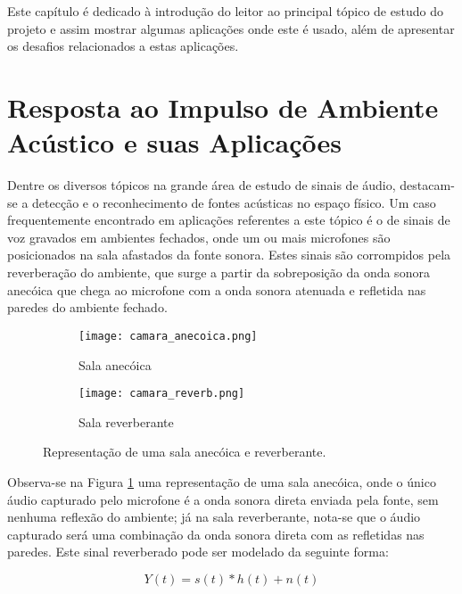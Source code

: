 Este capítulo é dedicado à introdução do leitor ao principal tópico de estudo do projeto e assim mostrar
algumas aplicações onde este é usado, além de apresentar os desafios relacionados a estas aplicações.

\section{Resposta ao Impulso de Ambiente Acústico e suas Aplicações}

Dentre os diversos tópicos na grande área de estudo de sinais de áudio, destacam-se a detecção e o reconhecimento de fontes acústicas no espaço físico.
Um caso frequentemente encontrado em aplicações referentes a este tópico é o de sinais de voz gravados em ambientes fechados,
onde um ou mais microfones são posicionados na sala afastados da fonte sonora.
Estes sinais são corrompidos pela reverberação do ambiente, que surge a partir da sobreposição da onda sonora anecóica que chega ao microfone com a 
onda sonora atenuada e refletida nas paredes do ambiente fechado. 

\begin{figure} [H]
    \begin{subfigure}{.5\textwidth}
        \centering
        \texttt{[image: camara\_anecoica.png]}
        \caption{Sala anecóica}    
    \end{subfigure}
    \begin{subfigure}{.5\textwidth}
        \centering
        \texttt{[image: camara\_reverb.png]}
        \caption{Sala reverberante}    
    \end{subfigure}
    \caption{Representação de uma sala anecóica e reverberante.}
    \label{fig:Rooms}
\end{figure}

Observa-se na Figura \ref{fig:Rooms} uma representação de uma sala anecóica, onde o único áudio capturado pelo microfone é a onda sonora direta
enviada pela fonte, sem nenhuma reflexão do ambiente; já na sala reverberante, nota-se que o áudio capturado será uma combinação da onda sonora direta
com as refletidas nas paredes. 
Este sinal reverberado pode ser modelado da seguinte forma:

\begin{equation} \label{eqn:model}
    Y(t) = s(t) \ast h(t) + n(t)
\end{equation}

